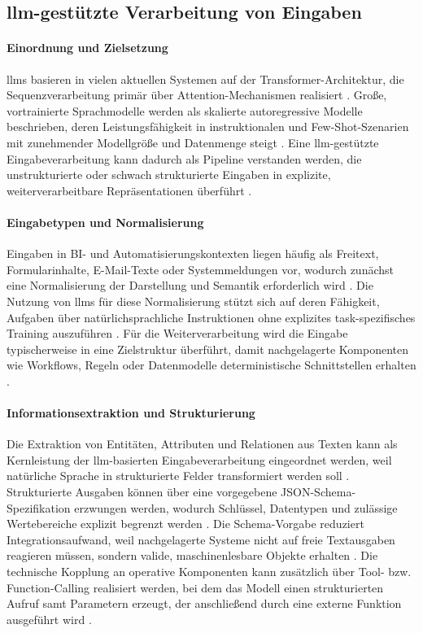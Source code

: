 \subsection{\gls{llm}-gestützte Verarbeitung von Eingaben}
\paragraph{Einordnung und Zielsetzung}
\glspl{llm} basieren in vielen aktuellen Systemen auf der Transformer-Architektur, die Sequenzverarbeitung primär über Attention-Mechanismen realisiert \cite{Vaswani2017}. 
Große, vortrainierte Sprachmodelle werden als skalierte autoregressive Modelle beschrieben, deren Leistungsfähigkeit in instruktionalen und Few-Shot-Szenarien mit zunehmender Modellgröße und Datenmenge steigt \cite{Brown2020}. 
Eine \gls{llm}-gestützte Eingabeverarbeitung kann dadurch als Pipeline verstanden werden, die unstrukturierte oder schwach strukturierte Eingaben in explizite, weiterverarbeitbare Repräsentationen überführt \cite{Brown2020}. 

\paragraph{Eingabetypen und Normalisierung}
Eingaben in BI- und Automatisierungskontexten liegen häufig als Freitext, Formularinhalte, E-Mail-Texte oder Systemmeldungen vor, wodurch zunächst eine Normalisierung der Darstellung und Semantik erforderlich wird \cite{Brown2020}. 
Die Nutzung von \glspl{llm} für diese Normalisierung stützt sich auf deren Fähigkeit, Aufgaben über natürlichsprachliche Instruktionen ohne explizites task-spezifisches Training auszuführen \cite{Brown2020}. 
Für die Weiterverarbeitung wird die Eingabe typischerweise in eine Zielstruktur überführt, damit nachgelagerte Komponenten wie Workflows, Regeln oder Datenmodelle deterministische Schnittstellen erhalten \cite{OpenAIStructuredOutputs}. 

\paragraph{Informationsextraktion und Strukturierung}
Die Extraktion von Entitäten, Attributen und Relationen aus Texten kann als Kernleistung der \gls{llm}-basierten Eingabeverarbeitung eingeordnet werden, weil natürliche Sprache in strukturierte Felder transformiert werden soll \cite{OpenAIStructuredOutputs}. 
Strukturierte Ausgaben können über eine vorgegebene JSON-Schema-Spezifikation erzwungen werden, wodurch Schlüssel, Datentypen und zulässige Wertebereiche explizit begrenzt werden \cite{OpenAIStructuredOutputs}. 
Die Schema-Vorgabe reduziert Integrationsaufwand, weil nachgelagerte Systeme nicht auf freie Textausgaben reagieren müssen, sondern valide, maschinenlesbare Objekte erhalten \cite{OpenAIStructuredOutputs}. 
Die technische Kopplung an operative Komponenten kann zusätzlich über Tool- bzw. Function-Calling realisiert werden, bei dem das Modell einen strukturierten Aufruf samt Parametern erzeugt, der anschließend durch eine externe Funktion ausgeführt wird \cite{OpenAIFunctionCalling}. 

